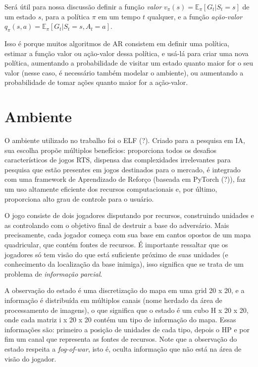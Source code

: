 Será útil para nossa discussão definir a função \textit{valor} $v_{\pi}(s) = \mathbb{E}_{\pi}[G_t | S_t = s]$
de um estado $s$, para a política $\pi$ em um tempo $t$ qualquer,
e a função \textit{ação-valor} $q_{\pi}(s, a) = \mathbb{E}_{\pi}[G_t | S_t = s, A_t = a]$.

Isso é porque muitos algoritmos de AR consistem em definir uma política,
estimar a função valor ou ação-valor dessa política, e usá-lá para criar uma nova política,
aumentando a probabilidade de visitar um estado quanto maior for o seu valor (nesse caso, é necessário também modelar o ambiente),
ou aumentando a probabilidade de tomar ações quanto maior for a ação-valor.


\section{Ambiente}

O ambiente utilizado no trabalho foi o ELF (?).
Criado para a pesquisa em IA, sua escolha propõe múltiplos benefícios: 
proporciona todos os desafios característicos de jogos RTS,
dispensa das complexidades irrelevantes para pesquisa que estão presentes em jogos destinados para o mercado,
é integrado com uma framework de Aprendizado de Reforço (baseada em PyTorch (?)),
faz um uso altamente eficiente dos recursos computacionais
e, por último, proporciona alto grau de controle para o usuário.

O jogo consiste de dois jogadores 
disputando por recursos, 
construindo unidades 
e as controlando 
com o objetivo final de destruir a base do adversário.
Mais precisamente, 
cada jogador começa com sua base em cantos opostos de um mapa quadricular,
que contém fontes de recursos. 
É importante ressaltar que os jogadores só tem visão do que está suficiente próximo de suas unidades 
(e conhecimento da localização da base inimiga), isso significa que se trata de um problema de \textit{informação parcial}.

A observação do estado é uma discretização do mapa em uma grid 20 x 20,
e a informação é distribuída em múltiplos canais (nome herdado da área de processamento de imagens), o que significa que o estado é um cubo H x 20 x 20, onde cada matriz i x 20 x 20 contém um tipo de informação do mapa. Essas informações são:
primeiro a posição de unidades de cada tipo, 
depois o HP 
e por fim um canal que representa as fontes de recursos.
Note que a observação do estado respeita a \textit{fog-of-war}, isto é, oculta informação que não está na área de visão do jogador.

